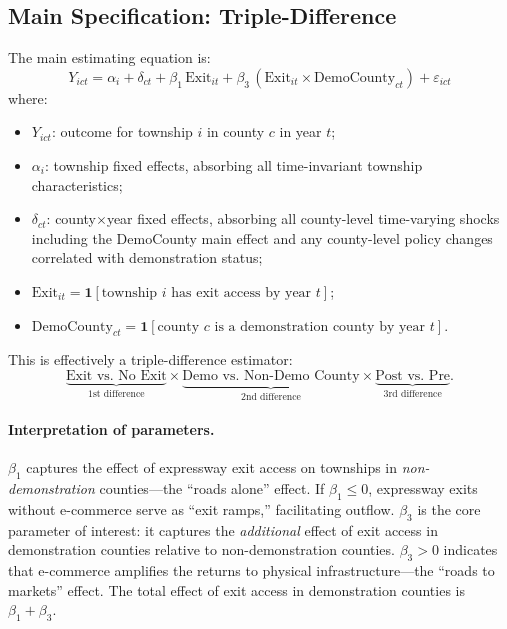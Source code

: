 \documentclass[12pt]{article}
\begin{document}
\subsection{Main Specification: Triple-Difference}

The main estimating equation is:
\begin{equation}\label{eq:ddd}
    Y_{ict} = \alpha_i + \delta_{ct} + \beta_1 \, \text{Exit}_{it} + \beta_3 \, (\text{Exit}_{it} \times \text{DemoCounty}_{ct}) + \varepsilon_{ict}
\end{equation}
where:
\begin{itemize}[nosep]
    \item $Y_{ict}$: outcome for township $i$ in county $c$ in year $t$;
    \item $\alpha_i$: township fixed effects, absorbing all time-invariant township characteristics;
    \item $\delta_{ct}$: county$\times$year fixed effects, absorbing all county-level time-varying shocks including the DemoCounty main effect and any county-level policy changes correlated with demonstration status;
    \item $\text{Exit}_{it} = \mathbf{1}[\text{township } i \text{ has exit access by year } t]$;
    \item $\text{DemoCounty}_{ct} = \mathbf{1}[\text{county } c \text{ is a demonstration county by year } t]$.
\end{itemize}

This is effectively a triple-difference estimator:
\begin{equation}
    \underbrace{\text{Exit vs.\ No Exit}}_{\text{1st difference}} \times \underbrace{\text{Demo vs.\ Non-Demo County}}_{\text{2nd difference}} \times \underbrace{\text{Post vs.\ Pre}}_{\text{3rd difference}}.
\end{equation}

\paragraph{Interpretation of parameters.}
$\beta_1$ captures the effect of expressway exit access on townships in \textit{non-demonstration} counties---the ``roads alone'' effect. If $\beta_1 \leq 0$, expressway exits without e-commerce serve as ``exit ramps,'' facilitating outflow. $\beta_3$ is the core parameter of interest: it captures the \textit{additional} effect of exit access in demonstration counties relative to non-demonstration counties. $\beta_3 > 0$ indicates that e-commerce amplifies the returns to physical infrastructure---the ``roads to markets'' effect. The total effect of exit access in demonstration counties is $\beta_1 + \beta_3$.
\end{document}
